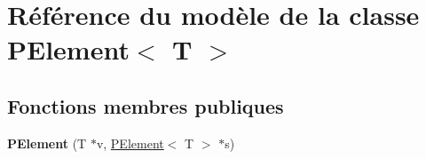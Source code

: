 \hypertarget{class_p_element}{}\section{Référence du modèle de la classe P\+Element$<$ T $>$}
\label{class_p_element}
\subsection*{Fonctions membres publiques}
\begin{DoxyCompactItemize}
\item 
\mbox{\label{class_p_element_ac2f52f03a936880e655e8bde2afc1308}} 
{\bfseries P\+Element} (T $\ast$v, \mbox{\hyperlink{class_p_element}{P\+Element}}$<$ T $>$ $\ast$s)
\end{DoxyCompactItemize}
